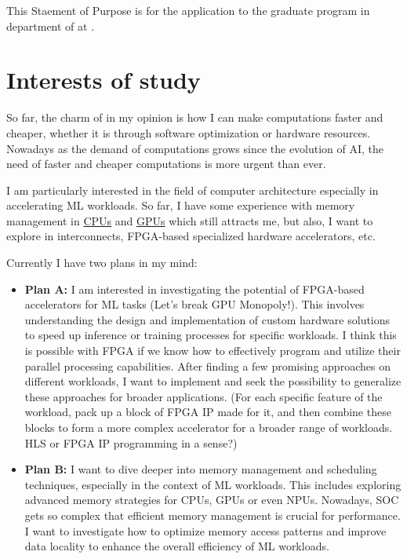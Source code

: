 \documentclass[a4 paper, 10pt]{article}
\begin{document}
{\selectfont %

This Staement of Purpose is for the application to the graduate program in department of \theDepartment{} at \theSchoolFullName{}.

\section*{Interests of study}
So far, the charm of \theDepartment{} in my opinion is how I can make computations faster and cheaper, whether it is through software optimization or hardware resources. Nowadays as the demand of computations grows since the evolution of AI, the need of faster and cheaper computations is more urgent than ever.

I am particularly interested in the field of computer architecture especially in accelerating ML workloads. So far, I have some experience with memory management in \hyperref[prefetching]{CPUs} and \hyperref[vllm]{GPUs} which still attracts me, but also, I want to explore in interconnects, FPGA-based specialized hardware accelerators, etc.

Currently I have two plans in my mind:
\begin{itemize}
    \item \textbf{Plan A:} I am interested in investigating the potential of FPGA-based accelerators for ML tasks (Let's break GPU Monopoly!). This involves understanding the design and implementation of custom hardware solutions to speed up inference or training processes for specific workloads. I think this is possible with FPGA if we know how to effectively program and utilize their parallel processing capabilities. 
    After finding a few promising approaches on different workloads, I want to implement and seek the possibility to generalize these approaches for broader applications. (For each specific feature of the workload, pack up a block of FPGA IP made for it, and then combine these blocks to form a more complex accelerator for a broader range of workloads. HLS or FPGA IP programming in a sense?)
    \item \textbf{Plan B:} I want to dive deeper into memory management and scheduling techniques, especially in the context of ML workloads. This includes exploring advanced memory strategies for CPUs, GPUs or even NPUs. Nowadays, SOC gets so complex that efficient memory management is crucial for performance. I want to investigate how to optimize memory access patterns and improve data locality to enhance the overall efficiency of ML workloads.
\end{itemize}
}
\end{document}

